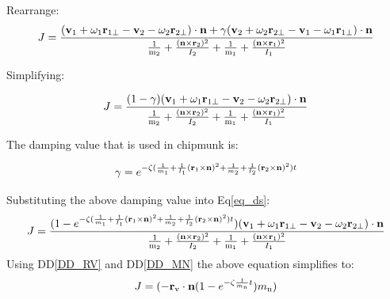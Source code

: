 \documentclass[12pt]{article}
\begin{document}
\noindent
Rearrange: 
\begin{equation*}
J =\frac{( \textbf v_\text{1} + \omega_\text{1}\textbf r_\text{1$\perp$} -
\textbf v_\text{2}
- \omega_\text{2}\textbf r_\text{2$\perp$}) \cdot \textbf n + \gamma(\textbf
v_\text{2} + \omega_\text{2}\textbf r_\text{2$\perp$} - \textbf v_\text{1} -
\omega_\text{1}\textbf r_\text{1$\perp$}) \cdot \textbf n }
{\frac{1}{ \textnormal m_\text{2}} + \frac{(\textbf n \times\textbf r_\text{2})
^{2}}{I_\text{2}} + \frac{1}{ \textnormal m_\text{1}} + \frac{(\textbf n \times
\textbf r_\text{1}) ^{2}}{I_\text{1}}}
\end{equation*}

\noindent
Simplifying: 

\begin{equation}
J =\frac{(1-\gamma)( \textbf v_\text{1} + \omega_\text{1}\textbf
r_\text{1$\perp$} - \textbf v_\text{2}
 - \omega_\text{2}\textbf  r_\text{2$\perp$}) \cdot \textbf n  }
{\frac{1}{ \textnormal m_\text{2}} + \frac{(\textbf n \times\textbf r_\text{2})
^{2}}{I_\text{2}} + \frac{1}{ \textnormal m_\text{1}} + \frac{(\textbf n \times
\textbf r_\text{1}) ^{2}}{I_\text{1}}} \label{eq_ds}
\end{equation}

\noindent
The damping value that is used in chipmunk is:

\begin{equation*}
\gamma = e^{-\zeta(\frac{1}{m_\text{1}} + \frac{1}{I_\text{1}}(\textbf
r_\text{1} \times \textbf n)^{2}
+ \frac{1}{m_\text{2}} + \frac{1}{I_\text{2}}(\textbf r_\text{2} \times \textbf
n)^{2})t}
\end{equation*}

\noindent
Substituting the above damping value into Eq\ref{eq_ds}:
\begin{equation*}
J =\frac{(1-e^{-\zeta(\frac{1}{m_\text{1}} + \frac{1}{I_\text{1}}(\textbf
r_\text{1} \times \textbf n)^{2}
+ \frac{1}{m_\text{2}} + \frac{1}{I_\text{2}}(\textbf r_\text{2} \times \textbf
n)^{2})t})( \textbf v_\text{1} + \omega_\text{1}\textbf r_\text{1$\perp$} -
\textbf v_\text{2}
 - \omega_\text{2}\textbf  r_\text{2$\perp$}) \cdot \textbf n  }
{\frac{1}{ \textnormal m_\text{2}} + \frac{(\textbf n \times\textbf r_\text{2})
^{2}}{I_\text{2}} + \frac{1}{ \textnormal m_\text{1}} + \frac{(\textbf n \times
\textbf r_\text{1}) ^{2}}{I_\text{1}}}
\end{equation*}
\noindent
Using DD\ref{DD_RV} and DD\ref{DD_MN} the above equation simplifies to: 
\begin{equation*}
J= (-\textbf r_\text{v} \cdot \textbf n (1 - e^{-\zeta \frac{1}{m_\text{n}}t})
m_\text{n}) \\
\end{equation*}
\end{document}

